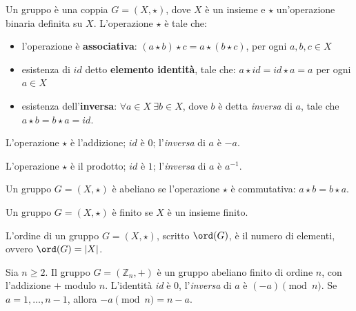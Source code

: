 \begin{definition}[Gruppo]
    Un gruppo è una coppia $G=(X,\star)$, dove $X$ è un insieme e $\star$ un'operazione binaria definita su $X$. L'operazione $\star$ è tale che:
\begin{itemize}
    \item l'operazione è \textbf{associativa}: $(a\star b)\star c=a\star (b \star c)$, per ogni $a,b,c \in X$
    \item esistenza di $id$ detto \textbf{elemento identità}, tale che: $a \star id=id \star a=a$ per ogni $a \in X$
    \item esistenza dell'\textbf{inversa}: $\forall a \in X \ \exists b \in X$, dove $b$ è detta \textit{inversa} di $a$, tale che $a \star b = b\star a= id$.
\end{itemize} 
\end{definition}

\begin{definition} L'operazione $\star$ è l'addizione; $id$ è $0$; l'\textit{inversa} di $a$ è $-a$.
\end{definition}

\begin{definition}
    L'operazione $\star$ è il prodotto; $id$ è $1$; l'\textit{inversa} di $a$ è $a^{-1}$.
\end{definition}

\begin{definition}
    Un gruppo $G=(X,\star)$ è abeliano se l'operazione $\star$ è commutativa: $a \star b=b \star a$. 
\end{definition}

\begin{definition}
     Un gruppo $G=(X,\star)$ è finito se $X$ è un insieme finito. 
\end{definition}

\begin{definition}
    L'ordine di un gruppo $G=(X,\star)$, scritto $\ord(G)$, è il numero di elementi, ovvero $\ord(G)=|X|$. 
\end{definition}

\begin{definition} 
    Sia $n\geq 2$. Il gruppo $G=(\mathbb{Z}_n,+)$ è un gruppo abeliano finito di ordine $n$, con l'addizione $+$ modulo $n$. L'identità \textit{id} è $0$, l'\textit{inversa} di $a$ è $(-a) \pmod n$. Se $a=1, \dots, n-1$, allora $-a \pmod n=n-a$.
\end{definition}

